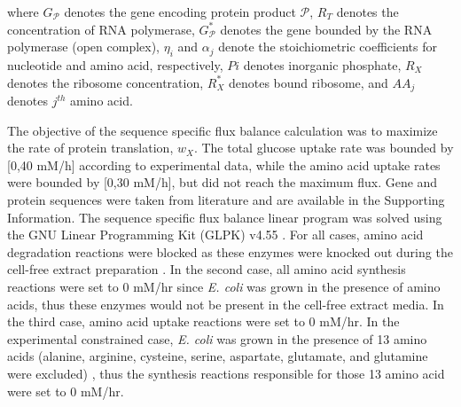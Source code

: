 \documentclass[journal=asbcd6,manuscript=article]{achemso}
\begin{document}
where $G_{\mathcal{P}}$ denotes the gene encoding protein product $\mathcal{P}$,
$R_{T}$ denotes the concentration of RNA polymerase,
$G_{\mathcal{P}}^{*}$ denotes the gene bounded by the RNA polymerase (open complex),
$\eta_{i}$ and $ \alpha_{j}$ denote the stoichiometric coefficients for nucleotide and amino acid, respectively,
$Pi$ denotes inorganic phosphate,
$R_{X}$ denotes the ribosome concentration,
$R_{X}^{*}$ denotes bound ribosome,
and $AA_{j}$ denotes $j^{th}$ amino acid.

The objective of the sequence specific flux balance calculation was to maximize the rate of protein translation, $w_{X}$.
The total glucose uptake rate was bounded by [0,40 mM/h] according to experimental data, while the amino acid uptake rates were bounded by [0,30 mM/h], but did not reach the maximum flux.
Gene and protein sequences were taken from literature and are available in the Supporting Information.
The sequence specific flux balance linear program was solved using the GNU Linear Programming Kit (GLPK) v4.55 \cite{GLPK}.
For all cases, amino acid degradation reactions were blocked as these enzymes were knocked out during the cell-free extract preparation \cite{2005_calhoun_BiotechnologyProgress, Garamella:2016aa}.
In the second case, all amino acid synthesis reactions were set to 0 mM/hr since \textit{E. coli} was grown in the presence of amino acids, thus these enzymes would not be present in the cell-free extract media.
In the third case, amino acid uptake reactions were set to 0 mM/hr.
In the experimental constrained case, \textit{E. coli} was grown in the presence of 13 amino acids (alanine, arginine, cysteine, serine, aspartate, glutamate, and glutamine were excluded) \cite{Zawada:2003}, thus the synthesis reactions responsible for those 13 amino acid were set to 0 mM/hr.
\end{document}
